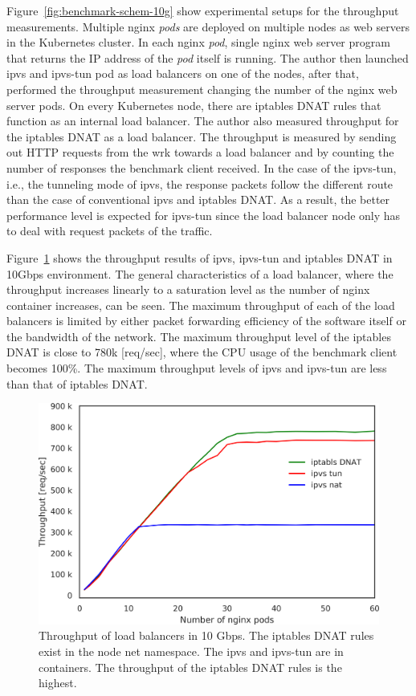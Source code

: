 Figure~\ref{fig:benchmark-schem-10g} show experimental setups for the throughput measurements.
Multiple nginx {\em pods} are deployed on multiple nodes as web servers in the Kubernetes cluster.
In each nginx {\em pod}, single nginx web server program that returns the IP address of the {\em pod} itself is running.
The author then launched ipvs and ipvs-tun pod as load balancers on one of the nodes, after that, performed the throughput measurement changing the number of the nginx web server pods.
On every Kubernetes node, there are iptables DNAT rules that function as an internal load balancer.
The author also measured throughput for the iptables DNAT as a load balancer.
The throughput is measured by sending out HTTP requests from the wrk towards a load balancer and by counting the number of responses the benchmark client received.
In the case of the ipvs-tun, i.e., the tunneling mode of ipvs, the response packets follow the different route than the case of conventional ipvs and iptables DNAT.
As a result, the better performance level is expected for ipvs-tun since the load balancer node only has to deal with request packets of the traffic.

\FloatBarrier

Figure~\ref{fig:ipvs_l3dsr_10g} shows the throughput results of ipvs, ipvs-tun and iptables DNAT in 10Gbps environment.
The general characteristics of a load balancer, where the throughput increases linearly to a saturation level as the number of nginx container increases, can be seen.
The maximum throughput of each of the load balancers is limited by either packet forwarding efficiency of the software itself or the bandwidth of the network.
The maximum throughput level of the iptables DNAT is close to 780k [req/sec], where the CPU usage of the benchmark client becomes 100\%.
The maximum throughput levels of ipvs and ipvs-tun are less than that of iptables DNAT. 

\begin{figure}[h]
  \centering
  \includegraphics[width=0.8\columnwidth]{Figs/ipvs_l3dsr_10g}
  \par\bigskip
  \centering
  \begin{minipage}{0.9\columnwidth}
    \caption[Throughput of load balancers in 10 Gbps]{
      Throughput of load balancers in 10 Gbps.
      The iptables DNAT rules exist in the node net namespace.
      The ipvs and ipvs-tun are in containers.
      The throughput of the iptables DNAT rules is the highest.
    }
    \label{fig:ipvs_l3dsr_10g}
  \end{minipage}
\end{figure}

